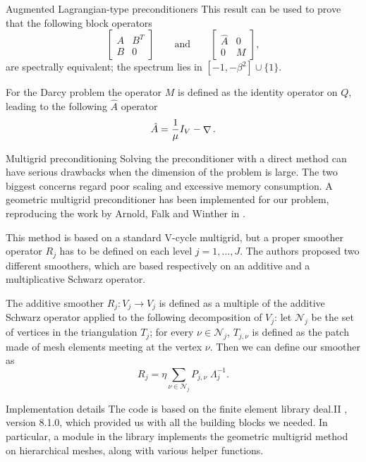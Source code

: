 \documentclass[final]{beamer}
\newlength{\onecolwid}
\DeclareMathOperator{\grad}{\nabla}
\let\div\relax
\DeclareMathOperator{\div}{div}
\begin{document}
\begin{frame}[t]
\begin{columns}[t]
\begin{column}{\onecolwid}
\begin{block}{Augmented Lagrangian-type preconditioners}
This result can be used to prove that the following block operators
\[
    \begin{bmatrix}A & B^T \\ B & 0\end{bmatrix}
    \qquad\text{and}\qquad
    \begin{bmatrix}\hat{A} & 0 \\ 0 & M\end{bmatrix},
\]
are spectrally equivalent; the spectrum lies in $[-1, -\beta^2] \cup \{1\}$.

For the Darcy problem the operator $M$ is defined as the identity operator on
$Q$, leading to the following $\hat{A}$ operator
\[
    \hat{A} = \frac{1}{\mu} I_V - \grad \div.
\]
\end{block}

\begin{block}{Multigrid preconditioning}
Solving the preconditioner with a direct method can have serious drawbacks when
the dimension of the problem is large. The two biggest concerns regard poor
scaling and excessive memory consumption. A geometric multigrid preconditioner
has been implemented for our problem, reproducing the work by Arnold, Falk and
Winther in \cite{arnold1997preconditioning}.

This method is based on a standard V-cycle multigrid, but a proper smoother
operator $R_j$ has to be defined on each level $j=1,\dots,J$. The authors
proposed two different smoothers, which are based respectively on an additive
and a multiplicative Schwarz operator.

The additive smoother $R_j : V_j \rightarrow V_j$ is defined as a multiple of
the additive Schwarz operator applied to the following decomposition of $V_j$:
let $\mathcal{N}_j$ be the set of vertices in the triangulation $T_j$; for
every $\nu \in \mathcal{N}_j$, $T_{j, \nu}$ is defined as the patch made of
mesh elements meeting at the vertex $\nu$.
Then we can define our smoother as
\[
    R_j = \eta \sum_{\nu \in \mathcal{N}_j} P_{j, \nu} \; \Lambda_{j}^{-1}.
\]
\end{block}

\begin{block}{Implementation details}
The code is based on the finite element library deal.II
\cite{BangerthHartmannKanschat2007}, version 8.1.0, which
provided us with all the building blocks we needed.
In particular, a module in the library implements the geometric multigrid
method on hierarchical meshes, along with various helper functions.


\end{block}
\end{column}
\end{columns}
\end{frame}
\end{document}
